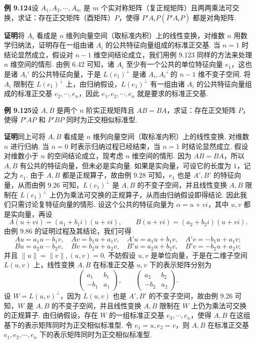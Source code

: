 \documentclass[UTF8,12pt,a4paper,fontset=fandol]{ctexart}
\begin{document}
\noindent\textbf{例 9.124}\quad 设 $A_1,A_2,\cdots,A_m$ 是 $m$ 个实对称矩阵（复正规矩阵）且两两乘法可交换，求证：存在正交矩阵（酉矩阵）$P$，使得 $P'A_iP(\overline{P}'A_iP)$ 都是对角矩阵.

\noindent\textbf{证明}\quad 将 $A_i$ 看成是 $n$ 维列向量空间（取标准内积）上的线性变换，对维数 $n$ 用数学归纳法，证明存在一组由诸 $A_i$ 的公共特征向量组成的标准正交基. 当 $n=1$ 时结论显然成立，假设对 $n-1$ 维空间结论成立，我们用例 9.123 同样的方法来处理 $n$ 维空间的情形. 由例 6.42 可知，诸 $A_i$ 至少有一个公共的单位特征向量 $e_1$，这也是诸 $A_i'$ 的公共特征向量，于是 $L(e_1)^\perp$ 是诸 $A_i,A_i'$ 的 $n-1$ 维不变子空间. 将 $A_i$ 限制在 $L(e_1)^\perp$ 上，由归纳假设，$L(e_1)^\perp$ 有一组由诸 $A_i$ 的公共特征向量组成的标准正交基 $e_2,\cdots,e_n$，因此 $e_1,e_2,\cdots,e_n$ 就是要求的标准正交基.

\noindent\textbf{例 9.125}\quad 设 $A,B$ 是两个 $n$ 阶实正规矩阵且 $AB=BA$，求证：存在正交矩阵 $P$，使得 $P'AP$ 和 $P'BP$ 同时为正交相似标准型.

\noindent\textbf{证明}\quad 同上可将 $A,B$ 看成是 $n$ 维列向量空间（取标准内积）上的线性变换. 对维数 $n$ 进行归纳. 当 $n=0$ 时表示归纳过程已经结束，当 $n=1$ 时结论显然成立. 假设对维数小于 $n$ 的空间结论成立，现考虑 $n$ 维空间的情形. 因为 $AB=BA$，所以 $A,B$ 有公共的特征向量，但未必是实向量. 如果是实向量，可设它的长度为 $1$，记之为 $e_1$. 由于 $A,B$ 都是正规算子，故由例 9.28 可知，$e_1$ 也是 $A',B'$ 的特征向量，从而由例 9.26 可知，$L(e_1)^\perp$ 是 $A,B$ 的不变子空间，并且线性变换 $A,B$ 限制在 $L(e_1)^\perp$ 上仍为乘法可交换的正规算子，从而由归纳假设即得结论. 因此我们只需讨论复特征向量的情形. 设这个公共的特征向量为 $\alpha=u+vi$，其中 $u,v$ 都是实向量，再设
\[
A(u+vi)=(a_1+b_1i)(u+vi),\qquad B(u+vi)=(a_2+b_2i)(u+vi).
\]
由例 9.86 的证明过程及其结论，我们可得
\[
Au=a_1u-b_1v,\quad Av=b_1u+a_1v,\quad A'u=a_1u+b_1v,\quad A'v=-b_1u+a_1v;
\]
\[
Bu=a_2u-b_2v,\quad Bv=b_2u+a_2v,\quad B'u=a_2u+b_2v,\quad B'v=-b_2u+a_2v;
\]
并且 $\|u\|=\|v\|,(u,v)=0$. 不妨假设 $u,v$ 是单位向量，于是在二维子空间 $L(u,v)$ 上，线性变换 $A,B$ 在标准正交基 $u,v$ 下的表示矩阵分别为
\[
\begin{pmatrix}
a_1&b_1\\
-b_1&a_1
\end{pmatrix},\qquad
\begin{pmatrix}
a_2&b_2\\
-b_2&a_2
\end{pmatrix}.
\]
设 $W=L(u,v)^\perp$，因为 $L(u,v)$ 也是 $A',B'$ 的不变子空间，故由例 9.26 可知，$W$ 是 $A,B$ 的不变子空间，并且线性变换 $A,B$ 限制在 $W$ 上仍为乘法可交换的正规算子. 由归纳假设，存在 $W$ 的一组标准正交基 $e_3,\cdots,e_n$，使得 $A,B$ 在这组基下的表示矩阵同时为正交相似标准型. 令 $e_1=u,e_2=v$，则 $A,B$ 在标准正交基 $e_1,e_2,\cdots,e_n$ 下的表示矩阵同时为正交相似标准型.
\end{document}
